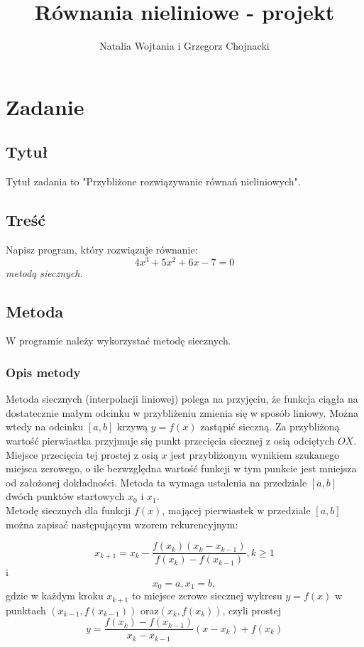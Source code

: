 \documentclass[12pt]{article}
\title{Równania nieliniowe - projekt}
\author{Natalia Wojtania i Grzegorz Chojnacki}
\begin{document}
\maketitle

\section{Zadanie}
\subsection{Tytuł}
Tytuł zadania to "Przybliżone rozwiązywanie równań nieliniowych".
\subsection{Treść}
Napisz program, który rozwiązuje równanie: $$4x^{3} + 5x^{2} + 6x - 7 = 0$$\emph{metodą siecznych.} 
\subsection{Metoda}
W programie należy wykorzystać metodę siecznych.
\subsubsection{Opis metody}
 
Metoda siecznych (interpolacji liniowej) polega na przyjęciu, że funkcja ciągła na dostatecznie małym odcinku w przybliżeniu zmienia się w sposób liniowy. Można wtedy na odcinku $[a,b]$ krzywą $y=f(x)$ zastąpić sieczną. Za przybliżoną wartość pierwiastka przyjmuje się punkt przecięcia siecznej z osią odciętych $OX$. Miejsce przecięcia tej prostej z osią $x$ jest przybliżonym wynikiem szukanego miejsca zerowego, o ile bezwzględna wartość funkcji w tym punkcie jest mniejsza od założonej dokładności.  Metoda ta wymaga ustalenia na przedziale $[a,b]$ dwóch punktów startowych $x_0$ i $x_1$.\\
Metodę siecznych dla funkcji $f(x)$, mającej pierwiastek w przedziale $[ a , b ]$ można zapisać następującym wzorem rekurencyjnym:

 $$x_{k+1}=x_k - \frac{f(x_k)(x_k-x_{k-1})}{f(x_k)-f(x_{k-1})}, k \geq 1$$ i $$x_0=a, x_1=b, $$ gdzie w każdym kroku $ x_{k+1}$ to miejsce zerowe siecznej wykresu $y=f(x)$ w punktach $(x_{k-1},f(x_{k-1}))$ oraz$ (x_{k},f(x_{k})) $, czyli prostej $$y=\frac{f(x_k)-f(x_{k-1})}{x_k-x_{k-1}}(x-x_k)+f(x_k)$$
\end{document}
